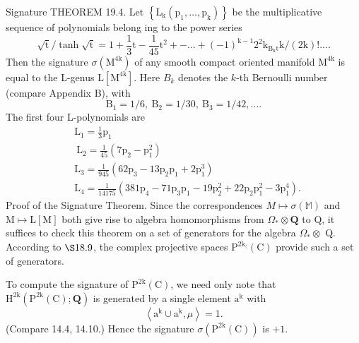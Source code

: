\documentclass[10pt]{article}
\begin{document}
Signature THEOREM 19.4. Let $\left\{\mathrm{L}_{\mathrm{k}}\left(\mathrm{p}_{1}, \ldots, \mathrm{p}_{\mathrm{k}}\right)\right\}$ be the multiplicative sequence of polynomials belong ing to the power series
$$
\sqrt{\mathrm{t}} / \tanh \sqrt{\mathrm{t}}=1+\frac{1}{3} \mathrm{t}-\frac{1}{45} \mathrm{t}^{2}+-\ldots+(-1)^{\mathrm{k}-1} 2^{2} \mathrm{k}_{\mathrm{B}_{\mathrm{k}} \mathrm{t}} \mathrm{k} /(2 \mathrm{k}) ! \ldots .
$$
Then the signature $\sigma\left(\mathrm{M}^{4 \mathrm{k}}\right)$ of any smooth compact oriented manifold $\mathrm{M}^{4 \mathrm{k}}$ is equal to the L-genus $\mathrm{L}\left[\mathrm{M}^{4 \mathrm{k}}\right]$. Here $B_{k}$ denotes the $k$-th Bernoulli number (compare Appendix B), with
$$
\mathrm{B}_{1}=1 / 6, \mathrm{~B}_{2}=1 / 30, \mathrm{~B}_{3}=1 / 42, \ldots .
$$
The first four L-polynomials are
$$
\begin{aligned}
&\mathrm{L}_{1}=\frac{1}{3} \mathrm{p}_{1} \\
&\mathrm{~L}_{2}=\frac{1}{45}\left(7 \mathrm{p}_{2}-\mathrm{p}_{1}^{2}\right) \\
&\mathrm{L}_{3}=\frac{1}{945}\left(62 \mathrm{p}_{3}-13 \mathrm{p}_{2} \mathrm{p}_{1}+2 \mathrm{p}_{1}^{3}\right) \\
&\mathrm{L}_{4}=\frac{1}{14175}\left(381 \mathrm{p}_{4}-71 \mathrm{p}_{3} \mathrm{p}_{1}-19 \mathrm{p}_{2}^{2}+22 \mathrm{p}_{2} \mathrm{p}_{1}^{2}-3 \mathrm{p}_{1}^{4}\right) .
\end{aligned}
$$
Proof of the Signature Theorem. Since the correspondences $M \mapsto \sigma(\mathbb{M})$ and $\mathrm{M} \mapsto \mathrm{L}[\mathrm{M}]$ both give rise to algebra homomorphisms from $\Omega_{*} \otimes \mathbf{Q}$ to Q, it suffices to check this theorem on a set of generators for the algebra $\Omega_{*} \otimes$ Q. According to $\S 18.9$, the complex projective spaces $\mathrm{P}^{2 \mathrm{k}_{(}}(\mathrm{C})$ provide such a set of generators.

To compute the signature of $\mathrm{P}^{2 \mathrm{k}}(\mathrm{C})$, we need only note that $\mathrm{H}^{2 \mathrm{k}}\left(\mathrm{P}^{2 \mathrm{k}}(\mathrm{C}) ; \mathbf{Q}\right)$ is generated by a single element $\mathrm{a}^{\mathrm{k}}$ with
$$
\left\langle\mathrm{a}^{\mathrm{k}} \cup \mathrm{a}^{\mathrm{k}}, \mu\right\rangle=1 .
$$
(Compare 14.4, 14.10.) Hence the signature $\sigma\left(\mathrm{P}^{2 \mathrm{k}}(\mathrm{C})\right)$ is $+1$.
\end{document}
